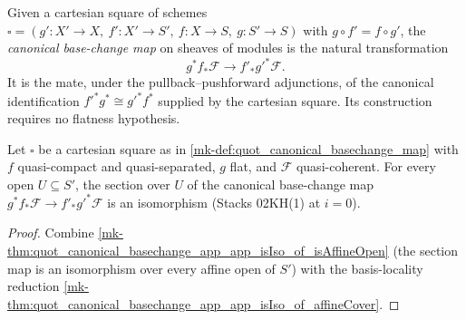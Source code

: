 \begin{definition}\label{mk-def:quot_canonical_basechange_map}
  \leanok

  Given a cartesian square of schemes
  \(\square = (g' : X' \to X,\ f' : X' \to S',\ f : X \to S,\ g : S' \to S)\)
  with \(g \circ f' = f \circ g'\), the
  \emph{canonical base-change map} on sheaves of modules is the natural
  transformation
  \[
    g^* f_* \mathcal F \longrightarrow f'_* g'^* \mathcal F.
  \]
  It is the mate, under the pullback--pushforward adjunctions, of the canonical
  identification \(f'^*g^*\cong g'^*f^*\) supplied by the cartesian square. Its
  construction requires no flatness hypothesis.
\end{definition}

\begin{theorem}\label{mk-thm:quot_canonical_basechange_app_app_isIso}
  \leanok

  Let \(\square\) be a cartesian square as in
  \ref{mk-def:quot_canonical_basechange_map} with \(f\) quasi-compact and
  quasi-separated, \(g\) flat, and \(\mathcal F\) quasi-coherent. For every
  open \(U \subseteq S'\), the section over \(U\) of the canonical
  base-change map
  \(g^* f_* \mathcal F \to f'_* g'^* \mathcal F\)
  is an isomorphism (Stacks 02KH(1) at \(i = 0\)).
\end{theorem}
\begin{proof}
  \leanok{}
  Combine \ref{mk-thm:quot_canonical_basechange_app_app_isIso_of_isAffineOpen}
  (the section map is an isomorphism over every affine open of \(S'\)) with
  the basis-locality reduction
  \ref{mk-thm:quot_canonical_basechange_app_app_isIso_of_affineCover}.
\end{proof}

